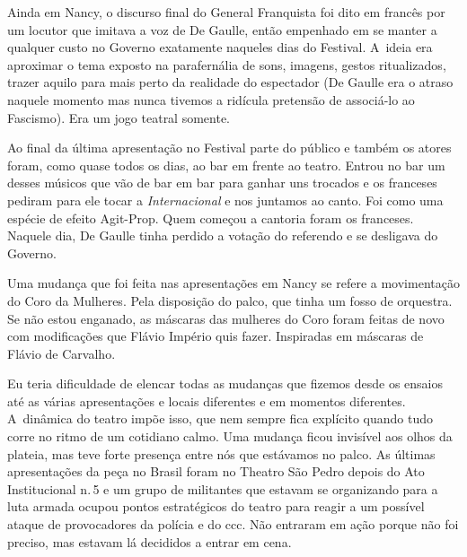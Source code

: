 Ainda em Nancy, o discurso final do General Franquista foi dito em
francês por um locutor que imitava a voz de De Gaulle, então empenhado
em se manter a qualquer custo no Governo exatamente naqueles dias do
Festival. A~ideia era aproximar o tema exposto na parafernália de sons,
imagens, gestos ritualizados, trazer aquilo para mais perto da realidade
do espectador (De Gaulle era o atraso naquele momento mas nunca tivemos
a ridícula pretensão de associá-lo ao Fascismo). Era um jogo teatral
somente.

Ao final da última apresentação no Festival parte do público e também os
atores foram, como quase todos os dias, ao bar em frente ao teatro.
Entrou no bar um desses músicos que vão de bar em bar para ganhar uns
trocados e os franceses pediram para ele tocar a {\it Internacional} e
nos juntamos ao canto. Foi como uma espécie de efeito Agit-Prop. Quem
começou a cantoria foram os franceses. Naquele dia, De Gaulle tinha
perdido a votação do referendo e se desligava do Governo.

Uma mudança que foi feita nas apresentações em Nancy se refere a
movimentação do Coro da Mulheres. Pela disposição do palco, que tinha um
fosso de orquestra. Se não estou enganado, as máscaras das mulheres do
Coro foram feitas de novo com modificações que Flávio Império quis
fazer. Inspiradas em máscaras de Flávio de Carvalho.

Eu teria dificuldade de elencar todas as mudanças que fizemos desde os
ensaios até as várias apresentações e locais diferentes e em momentos
diferentes. A~dinâmica do teatro impõe isso, que nem sempre fica
explícito quando tudo corre no ritmo de um cotidiano calmo. Uma mudança
ficou invisível aos olhos da plateia, mas teve forte presença entre nós
que estávamos no palco. As últimas apresentações da peça no Brasil foram
no Theatro São Pedro depois do Ato Institucional n.\,5 e um grupo de
militantes que estavam se organizando para a luta armada ocupou pontos
estratégicos do teatro para reagir a um possível ataque de provocadores
da polícia e do {\sc ccc}. Não entraram em ação porque não foi preciso, mas
estavam lá decididos a entrar em cena.

